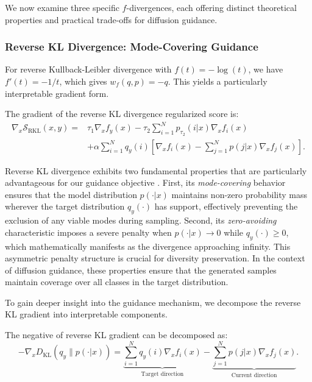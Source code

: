 \documentclass{article}
\begin{document}
We now examine three specific $f$-divergences, each offering distinct theoretical properties and practical trade-offs for diffusion guidance.
\subsubsection{Reverse KL Divergence: Mode-Covering Guidance}
\label{sec:rkl}

For reverse Kullback-Leibler divergence with $f(t) = -\log(t)$, we have $f'(t) = -1/t$, which gives $w_f(q, p) = -q$. This yields a particularly interpretable gradient form.

\begin{corollary}
\label{cor:rkl_gradient}
The gradient of the reverse KL divergence regularized score is:{\fontsize{8.5}{10}\selectfont
\begin{equation}
\begin{aligned}
\nabla_x \mathcal{S}_{\text{RKL}}(x, y) =& \tau_1 \nabla_x f_y(x) - \tau_2 \sum_{i=1}^N p_{\tau_2}(i|x) \nabla_x f_i(x) \\&+ \alpha \sum_{i=1}^N q_y(i) \left[\nabla_x f_i(x) - \sum_{j=1}^N p(j|x) \nabla_x f_j(x)\right].
\end{aligned}
\label{eq:rkl_gradient}
\end{equation}}
\end{corollary}

Reverse KL divergence exhibits two fundamental properties that are particularly advantageous for our guidance objective \citep{polyanskiy2025information, bishop2006pattern}. First, its \emph{mode-covering} behavior ensures that the model distribution $p(\cdot|x)$ maintains non-zero probability mass wherever the target distribution $q_y(\cdot)$ has support, effectively preventing the exclusion of any viable modes during sampling. Second, its \emph{zero-avoiding} characteristic imposes a severe penalty when $p(\cdot|x) \to 0$ while $q_y(\cdot) \geq 0$, which mathematically manifests as the divergence approaching infinity. This asymmetric penalty structure is crucial for diversity preservation. In the context of diffusion guidance, these properties ensure that the generated samples maintain coverage over all classes in the target distribution.

To gain deeper insight into the guidance mechanism, we decompose the reverse KL gradient into interpretable components.

\begin{lemma}
\label{lem:rkl_decomposition}
The negative of reverse KL gradient can be decomposed as:{\fontsize{8.5}{10}\selectfont
\begin{equation}
-\nabla_x D_{\text{KL}}(q_y \| p(\cdot|x)) =  \underbrace{\sum_{i=1}^N q_y(i) \nabla_x f_i(x)}_{\text{Target direction}} - \underbrace{\sum_{j=1}^N p(j|x) \nabla_x f_j(x)}_{\text{Current direction}}.
\label{eq:rkl_decomposition}
\end{equation}}
\end{lemma}
\end{document}
